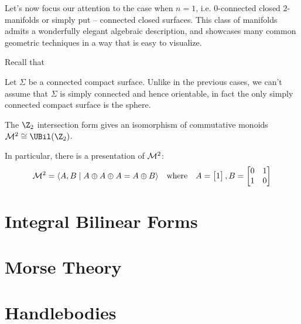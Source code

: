 Let's now focus our attention to the case when $n=1$, i.e. $0$-connected closed $2$-manifolds or simply put -- connected closed surfaces. This class of manifolds admits a wonderfully elegant algebraic description, and showcases many common geometric techniques in a way that is easy to visualize.

Recall that 

Let $\Sigma$ be a connected compact surface. Unlike in the previous cases, we can't assume that $\Sigma$ is simply connected and hence orientable, in fact the only simply connected compact surface is the sphere.


\begin{theorem}
	The $\Z_2$ intersection form gives an isomorphism of commutative monoids $\HC^2\cong \UBil(\Z_2)$. 
\end{theorem}

	In particular, there is a presentation of $\mathcal{M}^2$:
	\[
		\mathcal{M}^2 = \langle A, B \mid A\oplus A\oplus A = A\oplus B\rangle\quad\textrm{where}\quad A = \begin{bmatrix}1\end{bmatrix}, B = \begin{bmatrix}0&1\\1&0\end{bmatrix}
	\]

\section{Integral Bilinear Forms}

\section{Morse Theory}

\section{Handlebodies}
